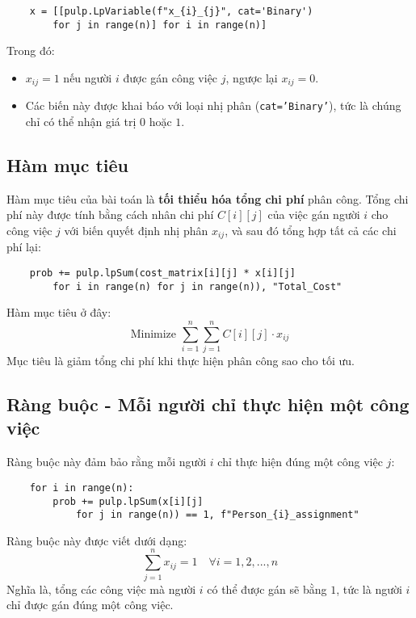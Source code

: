 \begin{verbatim}
    x = [[pulp.LpVariable(f"x_{i}_{j}", cat='Binary')
        for j in range(n)] for i in range(n)]
\end{verbatim}

Trong đó:
\begin{itemize}
    \item \(x_{ij} = 1\) nếu người \(i\) được gán công việc \(j\), ngược lại \(x_{ij} = 0\).
    \item Các biến này được khai báo với loại nhị phân (\texttt{cat='Binary'}), tức là chúng chỉ có thể nhận giá trị \(0\) hoặc \(1\).
\end{itemize}

\subsection{Hàm mục tiêu}

Hàm mục tiêu của bài toán là \textbf{tối thiểu hóa tổng chi phí} phân công. Tổng chi phí này được tính bằng cách nhân chi phí \(C[i][j]\) của việc gán người \(i\) cho công việc \(j\) với biến quyết định nhị phân \(x_{ij}\), và sau đó tổng hợp tất cả các chi phí lại:

\begin{verbatim}
    prob += pulp.lpSum(cost_matrix[i][j] * x[i][j]
        for i in range(n) for j in range(n)), "Total_Cost"
\end{verbatim}

Hàm mục tiêu ở đây:
\[
\text{Minimize } \sum_{i=1}^{n} \sum_{j=1}^{n} C[i][j] \cdot x_{ij}
\]
Mục tiêu là giảm tổng chi phí khi thực hiện phân công sao cho tối ưu.

\subsection{Ràng buộc - Mỗi người chỉ thực hiện một công việc}

Ràng buộc này đảm bảo rằng mỗi người \(i\) chỉ thực hiện đúng một công việc \(j\):

\begin{verbatim}
    for i in range(n):
        prob += pulp.lpSum(x[i][j]
            for j in range(n)) == 1, f"Person_{i}_assignment"
\end{verbatim}

Ràng buộc này được viết dưới dạng:
\[
\sum_{j=1}^{n} x_{ij} = 1 \quad \forall i = 1, 2, ..., n
\]
Nghĩa là, tổng các công việc mà người \(i\) có thể được gán sẽ bằng \(1\), tức là người \(i\) chỉ được gán đúng một công việc.


